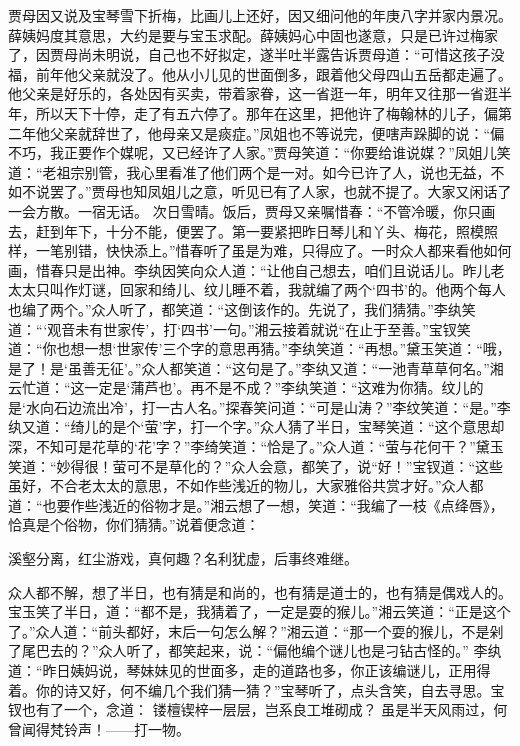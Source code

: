 \documentclass[12pt,oneside]{book}
\begin{document}
贾母因又说及宝琴雪下折梅，比画儿上还好，因又细问他的年庚八字并家内景况。薛姨妈度其意思，大约是要与宝玉求配。薛姨妈心中固也遂意，只是已许过梅家了，因贾母尚未明说，自己也不好拟定，遂半吐半露告诉贾母道：“可惜这孩子没福，前年他父亲就没了。他从小儿见的世面倒多，跟着他父母四山五岳都走遍了。他父亲是好乐的，各处因有买卖，带着家眷，这一省逛一年，明年又往那一省逛半年，所以天下十停，走了有五六停了。那年在这里，把他许了梅翰林的儿子，偏第二年他父亲就辞世了，他母亲又是痰症。”凤姐也不等说完，便嗐声跺脚的说：“偏不巧，我正要作个媒呢，又已经许了人家。”贾母笑道：“你要给谁说媒？”凤姐儿笑道：“老祖宗别管，我心里看准了他们两个是一对。如今已许了人，说也无益，不如不说罢了。”贾母也知凤姐儿之意，听见已有了人家，也就不提了。大家又闲话了一会方散。一宿无话。
次日雪晴。饭后，贾母又亲嘱惜春：“不管冷暖，你只画去，赶到年下，十分不能，便罢了。第一要紧把昨日琴儿和丫头、梅花，照模照样，一笔别错，快快添上。”惜春听了虽是为难，只得应了。一时众人都来看他如何画，惜春只是出神。李纨因笑向众人道：“让他自己想去，咱们且说话儿。昨儿老太太只叫作灯谜，回家和绮儿、纹儿睡不着，我就编了两个‘四书’的。他两个每人也编了两个。”众人听了，都笑道：“这倒该作的。先说了，我们猜猜。”李纨笑道：“‘观音未有世家传’，打‘四书’一句。”湘云接着就说“在止于至善。”宝钗笑道：“你也想一想‘世家传’三个字的意思再猜。”李纨笑道：“再想。”黛玉笑道：“哦，是了！是‘虽善无征’。”众人都笑道：“这句是了。”李纨又道：“一池青草草何名。”湘云忙道：“这一定是‘蒲芦也’。再不是不成？”李纨笑道：“这难为你猜。纹儿的是‘水向石边流出冷’，打一古人名。”探春笑问道：“可是山涛？”李纹笑道：“是。”李纨又道：“绮儿的是个‘萤’字，打一个字。”众人猜了半日，宝琴笑道：“这个意思却深，不知可是花草的‘花’字？”李绮笑道：“恰是了。”众人道：“萤与花何干？”黛玉笑道：“妙得很！萤可不是草化的？”众人会意，都笑了，说“好！”宝钗道：“这些虽好，不合老太太的意思，不如作些浅近的物儿，大家雅俗共赏才好。”众人都道：“也要作些浅近的俗物才是。”湘云想了一想，笑道：“我编了一枝《点绛唇》，恰真是个俗物，你们猜猜。”说着便念道：

溪壑分离，红尘游戏，真何趣？名利犹虚，后事终难继。

众人都不解，想了半日，也有猜是和尚的，也有猜是道士的，也有猜是偶戏人的。宝玉笑了半日，道：“都不是，我猜着了，一定是耍的猴儿。”湘云笑道：“正是这个了。”众人道：“前头都好，末后一句怎么解？”湘云道：“那一个耍的猴儿，不是剁了尾巴去的？”众人听了，都笑起来，说：“偏他编个谜儿也是刁钻古怪的。”
李纨道：“昨日姨妈说，琴妹妹见的世面多，走的道路也多，你正该编谜儿，正用得着。你的诗又好，何不编几个我们猜一猜？”宝琴听了，点头含笑，自去寻思。宝钗也有了一个，念道：
镂檀锲梓一层层，岂系良工堆砌成？
虽是半天风雨过，何曾闻得梵铃声！——打一物。
\end{document}
